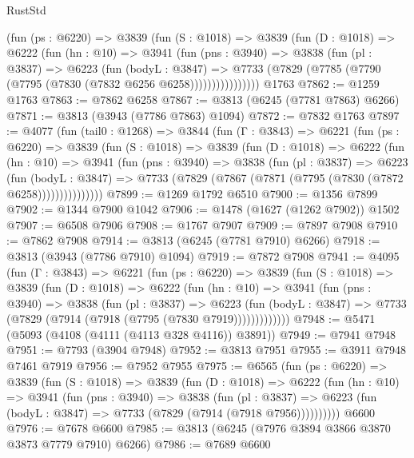 \begin{lexlean}{RustStd}
\begin{coremodule}
          (fun (ps : @6220) =>
          @3839
            (fun (S : @1018) =>
            @3839
              (fun (D : @1018) =>
              @6222
                (fun (hn : @10) =>
                @3941
                  (fun (pns : @3940) =>
                  @3838
                    (fun (pl : @3837) =>
                    @6223
                      (fun (bodyL : @3847) =>
                      @7733 (@7829 (@7785 (@7790 (@7795 (@7830 (@7832 @6256 @6258))))))))))))))))
    @1763
@7862 := @1259 @1763
@7863 := @7862 @6258
@7867 := @3813 (@6245 (@7781 @7863) @6266)
@7871 := @3813 (@3943 (@7786 @7863) @1094)
@7872 := @7832 @1763
@7897 := @4077
    (fun (tail0 : @1268) =>
    @3844
      (fun (Γ : @3843) =>
      @6221
        (fun (ps : @6220) =>
        @3839
          (fun (S : @1018) =>
          @3839
            (fun (D : @1018) =>
            @6222
              (fun (hn : @10) =>
              @3941
                (fun (pns : @3940) =>
                @3838
                  (fun (pl : @3837) =>
                  @6223
                    (fun (bodyL : @3847) =>
                    @7733 (@7829 (@7867 (@7871 (@7795 (@7830 (@7872 @6258)))))))))))))))
@7899 := @1269 @1792 @6510
@7900 := @1356 @7899
@7902 := @1344 @7900 @1042
@7906 := @1478 (@1627 (@1262 @7902)) @1502
@7907 := @6508 @7906
@7908 := @1767 @7907
@7909 := @7897 @7908
@7910 := @7862 @7908
@7914 := @3813 (@6245 (@7781 @7910) @6266)
@7918 := @3813 (@3943 (@7786 @7910) @1094)
@7919 := @7872 @7908
@7941 := @4095
    (fun (Γ : @3843) =>
    @6221
      (fun (ps : @6220) =>
      @3839
        (fun (S : @1018) =>
        @3839
          (fun (D : @1018) =>
          @6222
            (fun (hn : @10) =>
            @3941
              (fun (pns : @3940) =>
              @3838
                (fun (pl : @3837) =>
                @6223
                  (fun (bodyL : @3847) =>
                  @7733 (@7829 (@7914 (@7918 (@7795 (@7830 @7919)))))))))))))
@7948 := @5471 (@5093 (@4108 (@4111 (@4113 @328 @4116)) @3891))
@7949 := @7941 @7948
@7951 := @7793 (@3904 @7948)
@7952 := @3813 @7951
@7955 := @3911 @7948 @7461 @7919
@7956 := @7952 @7955
@7975 := @6565
    (fun (ps : @6220) =>
    @3839
      (fun (S : @1018) =>
      @3839
        (fun (D : @1018) =>
        @6222
          (fun (hn : @10) =>
          @3941
            (fun (pns : @3940) =>
            @3838
              (fun (pl : @3837) =>
              @6223 (fun (bodyL : @3847) => @7733 (@7829 (@7914 (@7918 @7956))))))))))
    @6600
@7976 := @7678 @6600
@7985 := @3813 (@6245 (@7976 @3894 @3866 @3870 @3873 @7779 @7910) @6266)
@7986 := @7689 @6600

\end{coremodule}
\end{lexlean}
